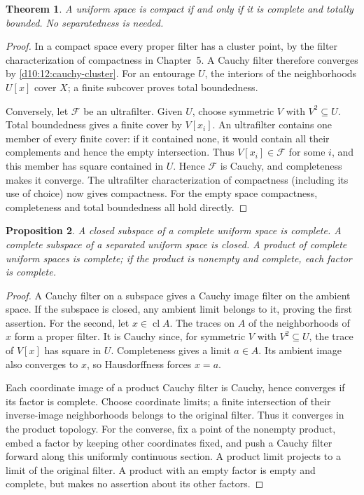 \documentclass[11pt,oneside,openany]{book}
\newtheorem{theorem}{Theorem}[chapter]
\newtheorem{proposition}[theorem]{Proposition}
\theoremstyle{definition}
\theoremstyle{remark}
\DeclareMathOperator{\cl}{cl}
\begin{document}
\begin{theorem}\label{d10:12:compact-complete-tb}
A uniform space is compact if and only if it is complete and totally bounded. No separatedness is needed.
\end{theorem}
\begin{proof}
In a compact space every proper filter has a cluster point, by the filter characterization of compactness in Chapter~5. A Cauchy filter therefore converges by \cref{d10:12:cauchy-cluster}. For an entourage $U$, the interiors of the neighborhoods $U[x]$ cover $X$; a finite subcover proves total boundedness.

Conversely, let $\mathcal F$ be an ultrafilter. Given $U$, choose symmetric $V$ with $V^2\subseteq U$. Total boundedness gives a finite cover by $V[x_i]$. An ultrafilter contains one member of every finite cover: if it contained none, it would contain all their complements and hence the empty intersection. Thus $V[x_i]\in\mathcal F$ for some $i$, and this member has square contained in $U$. Hence $\mathcal F$ is Cauchy, and completeness makes it converge. The ultrafilter characterization of compactness (including its use of choice) now gives compactness. For the empty space compactness, completeness and total boundedness all hold directly.
\end{proof}

\begin{proposition}\label{d10:12:complete-subspace-product}
A closed subspace of a complete uniform space is complete. A complete subspace of a separated uniform space is closed. A product of complete uniform spaces is complete; if the product is nonempty and complete, each factor is complete.
\end{proposition}
\begin{proof}
A Cauchy filter on a subspace gives a Cauchy image filter on the ambient space. If the subspace is closed, any ambient limit belongs to it, proving the first assertion. For the second, let $x\in\cl A$. The traces on $A$ of the neighborhoods of $x$ form a proper filter. It is Cauchy since, for symmetric $V$ with $V^2\subseteq U$, the trace of $V[x]$ has square in $U$. Completeness gives a limit $a\in A$. Its ambient image also converges to $x$, so Hausdorffness forces $x=a$.

Each coordinate image of a product Cauchy filter is Cauchy, hence converges if its factor is complete. Choose coordinate limits; a finite intersection of their inverse-image neighborhoods belongs to the original filter. Thus it converges in the product topology. For the converse, fix a point of the nonempty product, embed a factor by keeping other coordinates fixed, and push a Cauchy filter forward along this uniformly continuous section. A product limit projects to a limit of the original filter. A product with an empty factor is empty and complete, but makes no assertion about its other factors.
\end{proof}
\end{document}
